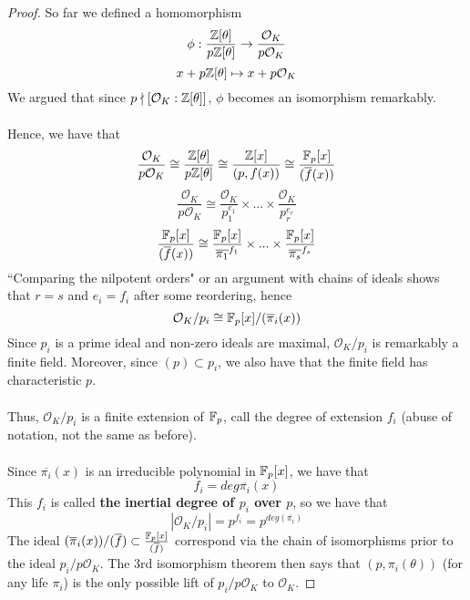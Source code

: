 \begin{proof}
So far we defined a homomorphism
\[\phi: \frac{\mathbb{Z}[\theta]}{p\mathbb{Z}[\theta]} \to \frac{\mathcal{O}_K}{p\mathcal{O}_K}\]
\[x + p \mathbb{Z}[\theta] \mapsto x + p \mathcal{O}_K\]
We argued that since $p \nmid [\mathcal{O}_K : \mathbb{Z}[\theta]]$, $\phi$ becomes an isomorphism remarkably.\\\\
Hence, we have that
\[\frac{\mathcal{O}_K}{p\mathcal{O}_K} \cong \frac{\mathbb{Z}[\theta]}{p\mathbb{Z}[\theta]} \cong \frac{\mathbb{Z}[x]}{(p, f(x))} \cong \frac{\mathbb{F}_p[x]}{(\overline{f}(x))}\]
\[\frac{\mathcal{O}_K}{p\mathcal{O}_K} \cong \frac{\mathcal{O}_K}{p_1^{e_1}} \times ... \times \frac{\mathcal{O}_K}{p_r^{e_r}}\]
\[\frac{\mathbb{F}_p[x]}{(\overline{f}(x))} \cong \frac{\mathbb{F}_p[x]}{\overline{\pi_1}^{f_1}} \times ... \times \frac{\mathbb{F}_p[x]}{\overline{\pi_s}^{f_s}}\]
``Comparing the nilpotent orders" or an argument with chains of ideals shows that $r = s$ and $e_i = f_i$ after some reordering, hence
\[\mathcal{O}_K / p_i \cong \mathbb{F}_p[x] / (\overline{\pi}_i(x))\]
Since $p_i$ is a prime ideal and non-zero ideals are maximal, $\mathcal{O}_K / p_i$ is remarkably a finite field. Moreover, since $(p) \subset p_i$, we also have that the finite field has characteristic $p$.\\\\
Thus, $\mathcal{O}_K / p_i$ is a finite extension of $\mathbb{F}_p$, call the degree of extension $f_i$ (abuse of notation, not the same as before).\\\\
Since $\overline{\pi_i}(x)$ is an irreducible polynomial in $\mathbb{F}_p[x]$, we have that
\[f_i = deg \overline{\pi_i}(x)\]
This $f_i$ is called \textbf{the inertial degree of $p_i$ over $p$}, so we have that
\[|\mathcal{O}_K / p_i| = p^{f_i} = p^{deg(\overline{\pi_i})}\]
The ideal $(\overline{\pi}_i(x))/(\overline{f}) \subset \frac{\mathbb{F}_p[x]}{(\overline{f})}$ correspond via the chain of isomorphisms prior to the ideal $p_i/p \mathcal{O}_K$. The 3rd isomorphism theorem then says that $(p, \pi_i(\theta))$ (for any life $\pi_i$) is the only possible lift of $p_i/p\mathcal{O}_K$ to $\mathcal{O}_K$.
\end{proof}

